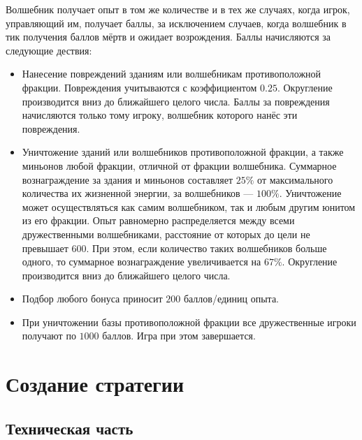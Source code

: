 Волшебник получает опыт в том же количестве и в тех же случаях, когда игрок, управляющий им, получает баллы, за исключением случаев, когда
волшебник в тик получения баллов мёртв и ожидает возрождения. Баллы начисляются за следующие дествия:
\begin{itemize}
    \item Нанесение повреждений зданиям или волшебникам противоположной фракции. Повреждения учитываются с коэффициентом $0.25$. Округление
        производится вниз до ближайшего целого числа. Баллы за повреждения начисляются только тому игроку, волшебник которого нанёс эти
        повреждения.
    \item Уничтожение зданий или волшебников противоположной фракции, а также миньонов любой фракции, отличной от фракции волшебника.
        Суммарное вознаграждение за здания и миньонов составляет $25\%$ от максимального количества их жизненной энергии, за волшебников ---
        $100\%$. Уничтожение может осуществляться как самим волшебником, так и любым другим юнитом из его фракции. Опыт равномерно
        распределяется между всеми дружественными волшебниками, расстояние от которых до цели не превышает $600$. При этом, если количество
        таких волшебников больше одного, то суммарное вознаграждение увеличивается на $67\%$. Округление производится вниз до ближайшего
        целого числа.
    \item Подбор любого бонуса приносит $200$ баллов/единиц опыта.
    \item При уничтожении базы противоположной фракции все дружественные игроки получают по $1000$ баллов. Игра при этом завершается.
\end{itemize}

\chapter{Создание стратегии}

\section{Техническая часть}

